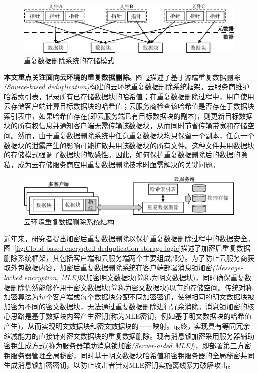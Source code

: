 \begin{figure}[!htb]
  \small
  \centering
  \includegraphics[width=\textwidth]{pic/background/dedupOverview.pdf}
  \caption{重复数据删除系统的存储模式}
  \label{fig:Deduplication-storage-pattern}
\end{figure}

\textbf{本文重点关注面向云环境的重复数据删除。}图~\ref{fig:Cloud-based-deduplication-storage-logic}描述了基于源端重复数据删除\textit{(Source-based deduplication)}构建的云环境重复数据删除系统框架。云服务商维护哈希索引表，记录所有已存储数据块的哈希值；在重复数据删除过程中，用户使用云存储客户端计算目标数据块的哈希值；云服务商检查该哈希值是否存在于数据块索引表中，如果哈希值存在(即云服务端已有目标数据块的副本)，则更新目标数据块的所有权信息并通知客户端无需传输该数据块，从而同时节省传输带宽和存储空间。然而，由于重复数据删除系统中任意重复数据块均只保留一个副本，任意一个数据块的泄露产生的影响可能扩散共用该数据块的所有文件。这种文件共用数据块的存储模式强调了数据块的敏感性。因此，如何保护重复数据删除后的数据的隐私，成为云存储服务商应用重复数据删除技术时亟需解决的关键问题。

\begin{figure}[!htb]
  \small
  \centering
  \includegraphics[width=\textwidth]{pic/background/Cloud-deduplication.pdf}
  \caption{云环境重复数据删除系统结构}
  \label{fig:Cloud-based-deduplication-storage-logic}
\end{figure}
近年来，研究者提出加密后重复数据删除以保护重复数据删除过程中的数据安全。图~\ref{fig:Cloud-based-encrypted-deduplication-storage-logic}描述了加密后重复数据删除系统框架，其包括客户端和云服务端两个主要组成部分。为了防止云服务商获取外包数据内容，加密后重复数据删除系统在客户端部署消息锁加密\textit{(Message-locked encryption, MLE)}以加密明文数据块(简称为明文数据块)，同时确保重复数据删除仍然能够作用于密文数据块(简称为密文数据块)以节约存储空间。传统对称加密算法为每个客户端或每个数据块分配不同加密密钥，使得相同的明文数据块被加密为不同的密文数据块，无法通过重复数据删除进行冗余消除。消息锁加密的核心思路是基于数据块内容产生密钥(称为MLE密钥，例如基于明文数据块的哈希值产生)，从而实现明文数据块和密文数据块的一一映射。最终，实现具有等同冗余缩减能力的直接针对密文数据块的重复数据删除。现有消息锁加密采用服务器辅助密钥生成方式(称为服务器辅助消息锁加密\textit{(Server-aided MLE)})，即部署第三方密钥服务器管理全局秘密，同时基于明文数据块哈希值和密钥服务器的全局秘密共同生成消息锁加密密钥，以防止攻击者针对MLE密钥实施离线暴力破解攻击。

